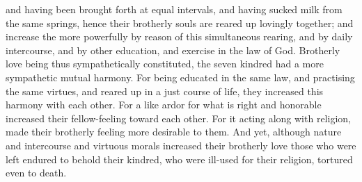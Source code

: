 {and having been brought forth at equal intervals, and having sucked milk from the same springs, hence their brotherly souls are reared up lovingly together;
and increase the more powerfully by reason of this simultaneous rearing, and by daily intercourse, and by other education, and exercise in the law of God.
Brotherly love being thus sympathetically constituted, the seven kindred had a more sympathetic mutual harmony.
For being educated in the same law, and practising the same virtues, and reared up in a just course of life, they increased this harmony with each other.
For a like ardor for what is right and honorable increased their fellow-feeling toward each other.
For it acting along with religion, made their brotherly feeling more desirable to them.
And yet, although nature and intercourse and virtuous morals increased their brotherly love those who were left endured to behold their kindred, who were ill-used for their religion, tortured even to death.

}
